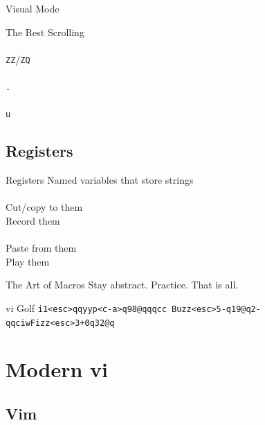 \documentclass{beamer}
\begin{document}
            \begin{frame}{Visual Mode}
            \end{frame}

            \begin{frame}{The Rest}
                Scrolling \\~\\
                \texttt{ZZ}/\texttt{ZQ} \\~\\
                \texttt{.} \\~\\
                \texttt{u}
            \end{frame}

        \subsection{Registers}

            \begin{frame}{Registers}
                Named variables that store strings \\~\\
                Cut/copy to them \\
                Record them \\~\\
                Paste from them \\
                Play them
            \end{frame}

            \begin{frame}{The Art of Macros}
                Stay abstract. \pause Practice. \pause That is all.
            \end{frame}

            \begin{frame}{vi Golf}
                \texttt{i1<esc>qqyyp<c-a>q98@qqqcc Buzz<esc>5-q19@q2-qqciwFizz<esc>3+0q32@q}
            \end{frame}

    \section{Modern vi}

        \subsection{Vim}
\end{document}
